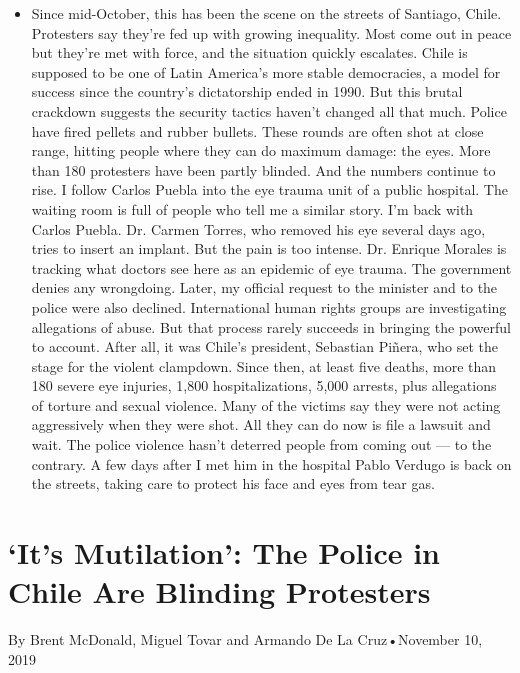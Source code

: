 \begin{itemize}
\tightlist
\item
  Since mid-October, this has been the scene on the streets of Santiago,
  Chile. Protesters say they're fed up with growing inequality. Most
  come out in peace but they're met with force, and the situation
  quickly escalates. Chile is supposed to be one of Latin America's more
  stable democracies, a model for success since the country's
  dictatorship ended in 1990. But this brutal crackdown suggests the
  security tactics haven't changed all that much. Police have fired
  pellets and rubber bullets. These rounds are often shot at close
  range, hitting people where they can do maximum damage: the eyes. More
  than 180 protesters have been partly blinded. And the numbers continue
  to rise. I follow Carlos Puebla into the eye trauma unit of a public
  hospital. The waiting room is full of people who tell me a similar
  story. I'm back with Carlos Puebla. Dr. Carmen Torres, who removed his
  eye several days ago, tries to insert an implant. But the pain is too
  intense. Dr. Enrique Morales is tracking what doctors see here as an
  epidemic of eye trauma. The government denies any wrongdoing. Later,
  my official request to the minister and to the police were also
  declined. International human rights groups are investigating
  allegations of abuse. But that process rarely succeeds in bringing the
  powerful to account. After all, it was Chile's president, Sebastian
  Piñera, who set the stage for the violent clampdown. Since then, at
  least five deaths, more than 180 severe eye injuries, 1,800
  hospitalizations, 5,000 arrests, plus allegations of torture and
  sexual violence. Many of the victims say they were not acting
  aggressively when they were shot. All they can do now is file a
  lawsuit and wait. The police violence hasn't deterred people from
  coming out --- to the contrary. A few days after I met him in the
  hospital Pablo Verdugo is back on the streets, taking care to protect
  his face and eyes from tear gas.
\end{itemize}

\hypertarget{its-mutilation-the-police-in-chile-are-blinding-protesters-1}{%
\section{`It's Mutilation': The Police in Chile Are Blinding
Protesters}\label{its-mutilation-the-police-in-chile-are-blinding-protesters-1}}

By Brent McDonald, Miguel Tovar and Armando De La Cruz•November 10, 2019

